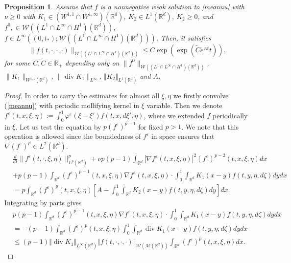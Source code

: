 \documentclass[10pt]{article}
\newtheorem{prop}{Proposition}
\def\divv{\operatorname {div}}
\newcommand*{\norm}[1]{\left\Vert{#1}\right\Vert}
\newcommand*{\abs}[1]{\left\vert{#1}\right\vert}
\newcommand{\vf}{\varphi}
\newcommand{\ve}{\varepsilon}
\newcommand{\R}{\mathbb{R}}
\newcommand{\izj}{\int_{0}^{1}}
\newcommand{\ird}{\int_{\mathbb{R}^d}}
\newcommand{\W}{\mathcal{W}}
\begin{document}
\begin{prop}\label{linftyestf}
Assume that $f$ is a nonnegative weak solution to \eqref{meannu} with $\nu \geq 0$ with $K_1\in (W^{1,1}\cap  W^{1,\infty})(\R^d)$, $K_2 \in L^{1}(\R^d)$, $K_2 \geq 0$,   and  $f^0, \in \W( (L^1\cap L^\infty\cap H^1)(\R^d))$, $f \in L^{\infty}((0,t_{*});\W( (L^1\cap L^\infty\cap H^1)(\R^d)))$.  Then,  it satisfies
  \[
 \|f(t,\cdot,\cdot,\cdot)\|_{\W((L^1\cap L^\infty\cap H^1)(\R^d))}\leq C \exp(\exp(\tilde{C}e^{At}t)),
  \]
for some $C,\tilde{C}\in \mathbb{R}_+$ depending only on $\|f^0\|_{\W((L^1\cap L^\infty\cap H^1)(\R^d))}$, $\|K_1\|_{W^{1,1}(\R^d)}$, $\|\divv K_1\|_{L^\infty}$, $\norm{K_2}_{L^{1}(\R^d)}$ and $A$.
\end{prop}
\begin{proof}
 

In order to carry the estimates for almost all $\xi,\eta$ we firstly convolve (\ref{meannu}) with periodic mollifying kernel in $\xi$ variable. Then we denote $f^\ve(t,x,\xi,\eta):=\izj \vf^{\ve}(\xi-\xi')f(t,x,d\xi',\eta)$, where we extended $f$ periodically in $\xi$.
 Let us test the equation  by $p(f^\ve)^{p-1}$ for fixed $p>1$. We note that this operation is allowed since the boundedness of $f^\ve$ in space ensures that $\nabla (f^\ve)^p \in L^2(\R^d)$.
\begin{align*}
    &\frac{d}{dt} \|f^\ve(t,\cdot,\xi,\eta)\|_{L^p(\R^d)}^p +\nu p(p-1) \ird \abs{\nabla f^\ve(t,x,\xi,\eta)}^{2}(f^\ve)^{p-2}(t,x,\xi,\eta)dx\\
    & +p(p-1)\ird (f^\ve)^{p-1}(t,x,\xi,\eta)\nabla f^\ve(t,x,\xi,\eta)\cdot\izj \ird K_{1}(x-y)f(t,y,\eta,d\zeta)dy dx \\
    & = p\ird (f^\ve)^{p}(t,x,\xi,\eta)\left[A - \izj \ird  K_{2}(x-y)f(t,y,\eta,d\zeta)dy  \right]dx.
\end{align*}
Integrating by parts gives
\begin{align*}
    & p(p-1)\ird (f^\ve)^{p-1}(t,x,\xi,\eta)\nabla f^\ve(t,x,\xi,\eta)\cdot\izj \ird K_{1}(x-y)f(t,y,\eta,d\zeta)dy dx\\
    & =-(p-1)\ird (f^\ve)^{p}(t,x,\xi,\eta)\izj \ird \divv K_{1}(x-y)f(t,y,\eta,d\zeta)dy dx\\
    & \leq (p-1)\norm{\divv K_1}_{L^{\infty}(\R^d)}\norm{f(t,\cdot,\cdot,\cdot)}_{\W(\mathcal{M}(\R^d))}\ird (f^\ve)^{p}(t,x,\xi,\eta)dx.
\end{align*}


\end{proof}
\end{document}
